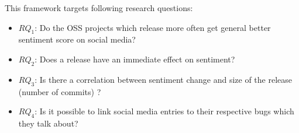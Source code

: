 This framework targets following research questions:
\begin{itemize}
\item{\textbf{$RQ_{1}$}: Do the OSS projects which release more often get general better sentiment score on social media?}
\item{\textbf{$RQ_{2}$}: Does a release have an immediate effect on sentiment?}
\item{\textbf{$RQ_{3}$}: Is there a correlation between sentiment change and size of the release (number of commits) ?}
\item{\textbf{$RQ_{4}$}: Is it possible to link social media entries to their respective bugs which they talk about?}
\end{itemize}